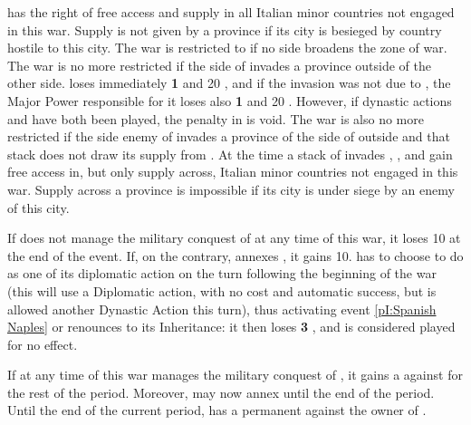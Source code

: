 \phmil
{} \FRA has the right of free access and supply in
all Italian minor countries not engaged in this war. Supply is not given by a
province if its city is besieged by country hostile to this city.
\bparag The war is restricted to \regionItalie if no side broadens the zone of
war.
\bparag The war is no more restricted if the side of \FRA invades a province
outside \regionItalie of the other side. \FRA loses immediately {\bf 1} \STAB
and 20 \VP, and if the invasion was not due to \FRA, the Major Power
responsible for it loses also {\bf 1} \STAB and 20 \VP. However, if dynastic
actions  and  have both
been played, the penalty in \VP is void.
\bparag The war is also no more restricted if the side enemy of \FRA invades a
province of the side of \FRA outside \regionItalie and that stack does not
draw its supply from \regionItalie.
\aparag At the time a stack of \FRA invades \provinceCampania, \FRA, \SPA and
\HAB gain free access in, but only supply across, Italian minor countries not
engaged in this war. Supply across a province is impossible if its city is
under siege by an enemy of this city.

\phinter
\aparag If \FRA does not manage the military conquest of  at any
time of this war, it loses 10 \VP at the end of the event.
\aparag If, on the contrary, \FRA annexes \provinceCampania, it gains 10\VP.
 \SPA has to choose to do  as
one of its diplomatic action on the turn following the beginning of the war
(this will use a Diplomatic action, with no cost and automatic success, but
\SPA is allowed another Dynastic Action this turn), thus activating event
\ref{pI:Spanish Naples} or renounces to its Inheritance: it then loses {\bf 3}
\STAB, and  is considered played for no effect.

\effetlong
\aparag If at any time of this war \FRA manages the military conquest of
, it gains a \CB against \TUR for the rest of the period.
Moreover, \FRA may now annex \provinceTrakya until the end of the period.
\aparag Until the end of the current period, \FRA has a permanent \CB against
the owner of \provinceCampania.





